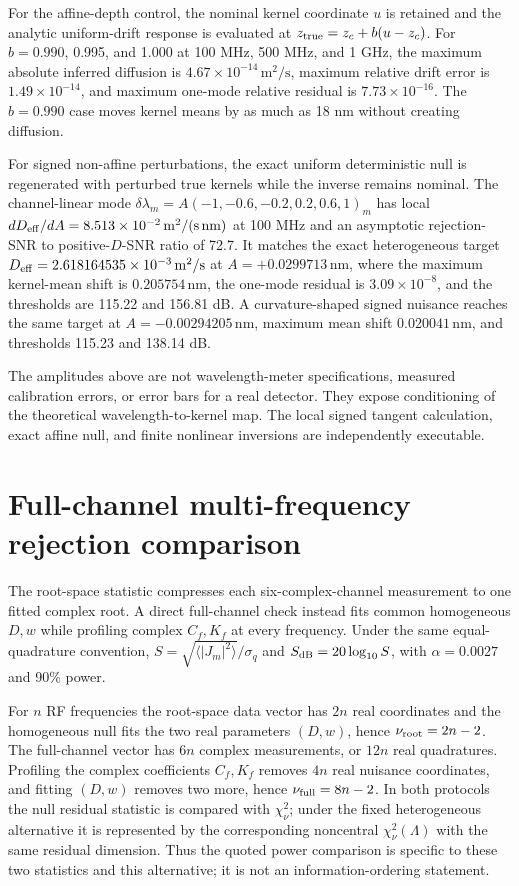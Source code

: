 \documentclass[aps,pra,onecolumn,superscriptaddress,nofootinbib]{revtex4-2}
\begin{document}
For the affine-depth control, the nominal kernel coordinate $u$ is retained and the analytic uniform-drift response is evaluated at $z_{\rm true}=z_c+b(u-z_c)$. For $b=0.990$, 0.995, and 1.000 at 100 MHz, 500 MHz, and 1 GHz, the maximum absolute inferred diffusion is $4.67\times10^{-14}\,\mathrm{m^2/s}$, maximum relative drift error is $1.49\times10^{-14}$, and maximum one-mode relative residual is $7.73\times10^{-16}$. The $b=0.990$ case moves kernel means by as much as 18 nm without creating diffusion.

For signed non-affine perturbations, the exact uniform deterministic null is regenerated with perturbed true kernels while the inverse remains nominal. The channel-linear mode $\delta\lambda_m=A(-1,-0.6,-0.2,0.2,0.6,1)_m$ has local $dD_{\rm eff}/dA=8.513\times10^{-2}\,\mathrm{m^2/(s\,nm)}$ at 100 MHz and an asymptotic rejection-SNR to positive-$D$-SNR ratio of 72.7. It matches the exact heterogeneous target $D_{\rm eff}=2.618164535\times10^{-3}\,\mathrm{m^2/s}$ at $A=+0.0299713\,\mathrm{nm}$, where the maximum kernel-mean shift is $0.205754\,\mathrm{nm}$, the one-mode residual is $3.09\times10^{-8}$, and the thresholds are 115.22 and 156.81 dB. A curvature-shaped signed nuisance reaches the same target at $A=-0.00294205\,\mathrm{nm}$, maximum mean shift $0.020041\,\mathrm{nm}$, and thresholds 115.23 and 138.14 dB.

The amplitudes above are not wavelength-meter specifications, measured calibration errors, or error bars for a real detector. They expose conditioning of the theoretical wavelength-to-kernel map. The local signed tangent calculation, exact affine null, and finite nonlinear inversions are independently executable.

\section{Full-channel multi-frequency rejection comparison}

The root-space statistic compresses each six-complex-channel measurement to one fitted complex root. A direct full-channel check instead fits common homogeneous $D,w$ while profiling complex $C_f,K_f$ at every frequency. Under the same equal-quadrature convention, $S=\sqrt{\langle|J_m|^2\rangle}/\sigma_q$ and $S_{\rm dB}=20\log_{10}S$, with $\alpha=0.0027$ and 90\% power.

For $n$ RF frequencies the root-space data vector has $2n$ real coordinates and the homogeneous null fits the two real parameters $(D,w)$, hence $\nu_{\rm root}=2n-2$. The full-channel vector has $6n$ complex measurements, or $12n$ real quadratures. Profiling the complex coefficients $C_f,K_f$ removes $4n$ real nuisance coordinates, and fitting $(D,w)$ removes two more, hence $\nu_{\rm full}=8n-2$. In both protocols the null residual statistic is compared with $\chi^2_{\nu}$; under the fixed heterogeneous alternative it is represented by the corresponding noncentral $\chi^2_{\nu}(\Lambda)$ with the same residual dimension. Thus the quoted power comparison is specific to these two statistics and this alternative; it is not an information-ordering statement.
\end{document}

